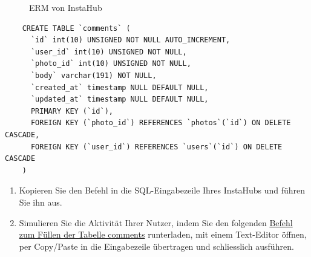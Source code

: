 \begin{figure}[H]
  \centering
  \caption{\gls{ERM} von InstaHub}
  \label{fig:erm-instahub}
\end{figure}

\begin{myexercise}
  \begin{lstlisting}
    CREATE TABLE `comments` (
      `id` int(10) UNSIGNED NOT NULL AUTO_INCREMENT,
      `user_id` int(10) UNSIGNED NOT NULL,
      `photo_id` int(10) UNSIGNED NOT NULL,
      `body` varchar(191) NOT NULL,
      `created_at` timestamp NULL DEFAULT NULL,
      `updated_at` timestamp NULL DEFAULT NULL,
      PRIMARY KEY (`id`),
      FOREIGN KEY (`photo_id`) REFERENCES `photos`(`id`) ON DELETE CASCADE,
      FOREIGN KEY (`user_id`) REFERENCES `users`(`id`) ON DELETE CASCADE
    )
  \end{lstlisting}
  \begin{enumerate}
    \item Kopieren Sie den Befehl in die SQL-Eingabezeile Ihres InstaHubs und führen Sie ihn aus.
    \item Simulieren Sie die Aktivität Ihrer Nutzer, indem Sie den folgenden \href{https://wi-wissen.github.io/instahub-doc-de/sql/comments.sql}{Befehl zum Füllen der Tabelle comments} runterladen, mit einem Text-Editor öffnen, per Copy/Paste in die Eingabezeile übertragen und schliesslich ausführen.
  \end{enumerate}

\end{myexercise}

